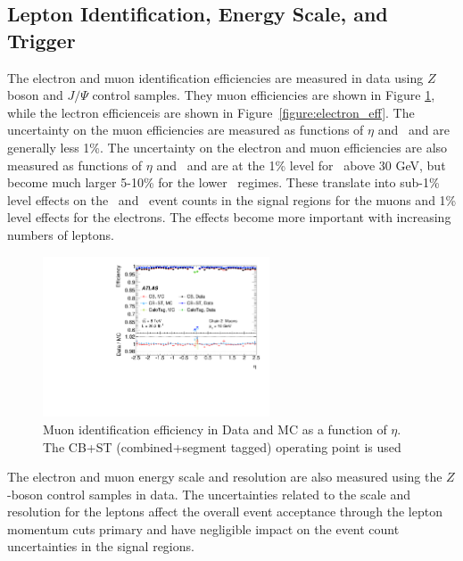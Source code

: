 \subsection{Lepton Identification, Energy Scale, and Trigger}
The electron\cite{ATLAS-CONF-2014-032} and muon identification efficiencies\cite{MuonSF} are measured in data using $Z$ boson and $J/\Psi$ control samples. They muon efficiencies are shown in Figure \ref{figure:systematics_lepidsf}, while the lectron efficienceis are shown in Figure~\ref{figure:electron_eff}. The uncertainty on the muon efficiencies are measured as functions of $\eta$ and \pt\ and are generally less 1\%. The uncertainty on the electron and muon efficiencies are also measured as functions of $\eta$ and \pt\ and are at the 1\% level for \pt\ above 30 GeV, but become much larger 5-10\% for the lower \pt\ regimes.   These translate into sub-1\% level effects on the \ttV\ and \tth\ event counts in the signal regions for the muons and 1\% level effects for the electrons. The effects become more important with increasing numbers of leptons.  

\begin{figure}[htbp]
\begin{center}
\includegraphics[width=0.60\textwidth]{figs/systematics/fig_18a}
\caption{Muon identification efficiency in Data and MC as a function of $\eta$. The CB+ST (combined+segment tagged) operating point is used}
\label{figure:systematics_lepidsf}
\end{center}
\end{figure}

The electron\cite{EgammaReco} and muon\cite{MuonSF} energy scale and resolution are also measured using the $Z$-boson control samples in data. The uncertainties related to the scale and resolution for the leptons affect the overall event acceptance through the lepton momentum cuts primary and have negligible impact on the event count uncertainties in the signal regions.

